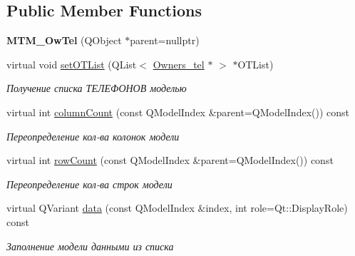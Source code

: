 \subsection*{Public Member Functions}
\begin{DoxyCompactItemize}
\item 
\mbox{\label{class_m_t_m___ow_tel_a3c450f42758a77f7d48d10682a92b87e}} 
{\bfseries M\+T\+M\+\_\+\+Ow\+Tel} (Q\+Object $\ast$parent=nullptr)
\item 
\mbox{\label{class_m_t_m___ow_tel_a753d9de053d54d21f5b73cf34899c278}} 
virtual void \mbox{\hyperlink{class_m_t_m___ow_tel_a753d9de053d54d21f5b73cf34899c278}{set\+O\+T\+List}} (Q\+List$<$ \mbox{\hyperlink{class_owners__tel}{Owners\+\_\+tel}} $\ast$ $>$ $\ast$O\+T\+List)
\begin{DoxyCompactList}\small\item\em Получение списка ТЕЛЕФОНОВ моделью \end{DoxyCompactList}\item 
\mbox{\label{class_m_t_m___ow_tel_ab00465e7d3e0f050cce2e886eb90091f}} 
virtual int \mbox{\hyperlink{class_m_t_m___ow_tel_ab00465e7d3e0f050cce2e886eb90091f}{column\+Count}} (const Q\+Model\+Index \&parent=Q\+Model\+Index()) const
\begin{DoxyCompactList}\small\item\em Переопределение кол-\/ва колонок модели \end{DoxyCompactList}\item 
\mbox{\label{class_m_t_m___ow_tel_a1e4a1836b6c9660f2a9c4c45beecf022}} 
virtual int \mbox{\hyperlink{class_m_t_m___ow_tel_a1e4a1836b6c9660f2a9c4c45beecf022}{row\+Count}} (const Q\+Model\+Index \&parent=Q\+Model\+Index()) const
\begin{DoxyCompactList}\small\item\em Переопределение кол-\/ва строк модели \end{DoxyCompactList}\item 
\mbox{\label{class_m_t_m___ow_tel_a032ef0c346e50ccf105d2747d2362fd3}} 
virtual Q\+Variant \mbox{\hyperlink{class_m_t_m___ow_tel_a032ef0c346e50ccf105d2747d2362fd3}{data}} (const Q\+Model\+Index \&index, int role=Qt\+::\+Display\+Role) const
\begin{DoxyCompactList}\small\item\em Заполнение модели данными из списка \end{DoxyCompactList}\item 

\end{DoxyCompactItemize}
